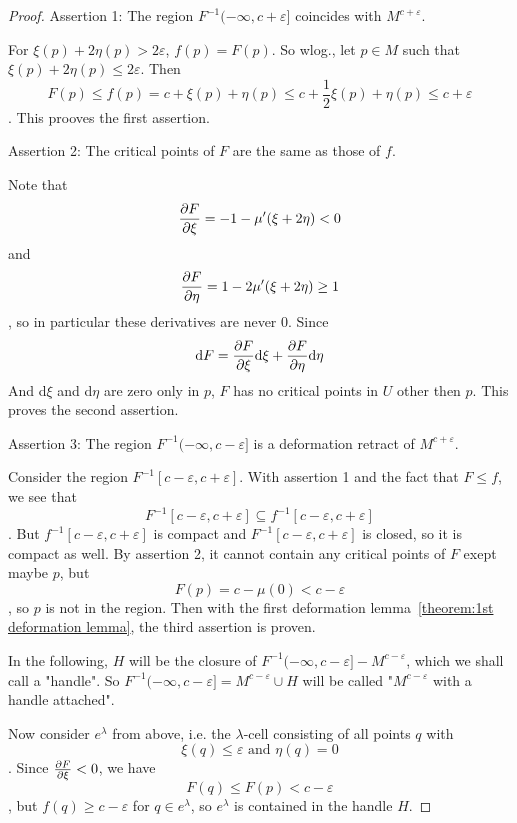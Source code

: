 \begin{proof}
   Assertion 1: The region $F^{-1}(-\infty, c + \varepsilon]$ coincides with 
   $M^{c + \varepsilon}$.

   For $\xi(p) + 2 \eta(p) > 2 \varepsilon$, $f(p) = F(p)$. So wlog., 
   let $p \in M$ such that $\xi(p) + 2 \eta(p) \leq 2 \varepsilon$. Then 
   \[ F(p) \leq f(p) = c + \xi(p) + \eta(p) 
   \leq c + \frac{1}{2} \xi(p) + \eta(p) 
   \leq c + \varepsilon \]. 
   This prooves the first assertion.

   Assertion 2: The critical points of $F$ are the same as those of $f$.

   Note that 
   \[ \pderive[F]{\xi} = -1 - \mu'(\xi + 2 \eta) < 0\]
   and
   \[ \pderive[F]{\eta} = 1 - 2 \mu'(\xi + 2 \eta) \geq 1 \]
   , so in particular these derivatives are never $0$. Since 
   \[ \opd F = \pderive[F]{\xi}\opd\xi + \pderive[F]{\eta} \opd \eta \]
   And d$\xi$ and d$\eta$ are zero only in $p$, $F$ has no critical points
   in $U$ other then $p$. This proves the second assertion.

   Assertion 3: The region $F^{-1}(-\infty, c - \varepsilon]$ is a deformation 
   retract of $M^{c + \varepsilon}$.

   Consider the region $F^{-1}[c - \varepsilon, c + \varepsilon]$. With 
   assertion 1 and the fact that $F \leq f$, we see that
   \[ F^{-1}[c - \varepsilon, c + \varepsilon] \subseteq f^{-1}[c - \varepsilon, c + \varepsilon] \] .
   But $f^{-1}[c - \varepsilon, c + \varepsilon]$ is compact and 
   $F^{-1}[c - \varepsilon, c + \varepsilon]$ is closed, so it is compact as 
   well. By assertion 2, it cannot contain any critical points of $F$ exept 
   maybe $p$, but
   \[ F(p) = c - \mu(0) < c - \varepsilon \],
   so $p$ is not in the region. Then with the first deformation 
   lemma~\ref{theorem:1st deformation lemma}, the third assertion is proven.
   
   In the following, $H$ will be the closure of 
   $F^{-1}(- \infty, c - \varepsilon] - M^{c - \varepsilon}$, which we shall 
   call a "handle". So $F^{-1}(- \infty, c - \varepsilon] = M^{c - \varepsilon} \cup H$
   will be called "$M^{c - \varepsilon}$ with a handle attached".

   Now consider $e^{\lambda}$ from above, i.e. the $\lambda$-cell consisting of
   all points $q$ with
   \[ \xi(q) \leq \varepsilon \text{ and } \eta(q) = 0 \].
   Since $\pderive[F]{\xi} < 0$, we have
   \[ F(q) \leq F(p) < c - \varepsilon \],
   but $f(q) \geq c - \varepsilon$ for $q \in e^{\lambda}$, so $e^{\lambda}$ 
   is contained in the handle $H$.


\end{proof}
